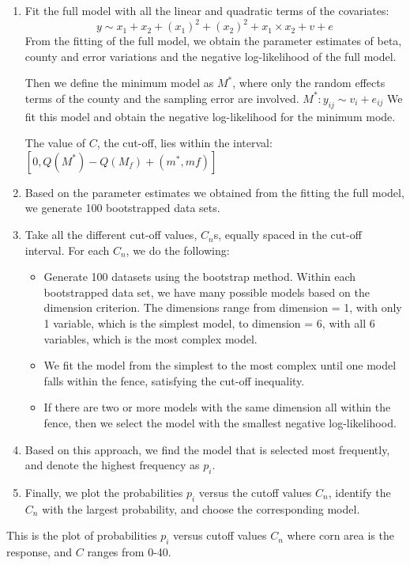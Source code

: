 \documentclass[11pt,letter]{article}
\begin{document}
\begin{enumerate}
\item Fit the full model with all the linear and quadratic terms of the covariates:
$$y\sim x_1 + x_2 + (x_1)^2 + (x_2)^2 + x_1\times x_2 + v + e$$
From the fitting of the full model, we obtain the parameter estimates of beta, county and error variations and the negative log-likelihood of the full model. 

Then we define the minimum model as $M^*$, where only the random effects terms of the county and the sampling error are involved. 
$M^*: y_{ij} \sim v_i + e_{ij}$
We fit this model and obtain the negative log-likelihood for the minimum mode. 

The value of $C$, the cut-off, lies within the interval: 
$[0, Q(M^*) - Q(M_f) + (m^*,mf)]$

\item Based on the parameter estimates we obtained from the fitting the full model, we generate 100 bootstrapped data sets.

\item Take all the different cut-off values, $C_n$s, equally spaced in the cut-off interval.  For each $C_n$, we do the following: 
\begin{itemize}
\item Generate 100 datasets using the bootstrap method.  Within each bootstrapped data set, we have many possible models based on the dimension criterion. The dimensions range from dimension = 1, with only 1 variable, which is the simplest model, to dimension = 6, with all  6 variables, which is the most complex model.

\item We fit the model from the simplest to the most complex until one model falls within the fence, satisfying the cut-off inequality. 

\item If there are two or more models with the same dimension all within the fence, then we select the model with the smallest negative log-likelihood.
\end{itemize}
\item Based on this approach, we find the model that is selected most frequently, and denote the  highest frequency as $p_i$.
\item Finally, we plot the probabilities $p_i$ versus the cutoff values $C_n$, identify the $C_n$ with the largest probability, and choose the corresponding model.
\end{enumerate}
This is the plot of probabilities $p_i$ versus cutoff values $C_n$ where corn area is the response, and $C$ ranges from 0-40.
\end{document}

